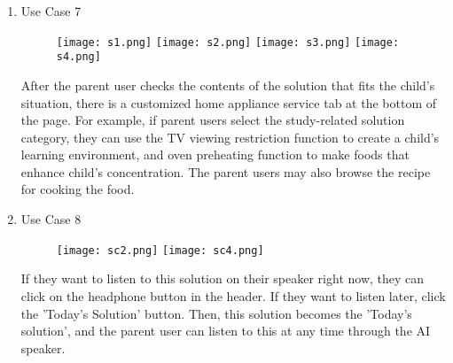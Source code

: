 \documentclass[conference]{IEEEtran}
\begin{document}
\begin{enumerate}
\begin{enumerate}
        \item Use Case 7
        \begin{figure}[H]
        \centering
        \texttt{[image: s1.png]}
        \texttt{[image: s2.png]}
        \texttt{[image: s3.png]}
        \texttt{[image: s4.png]}
        \end{figure}
        After the parent user checks the contents of the solution that fits the child's situation, there is a customized home appliance service tab at the bottom of the page. For example, if parent users select the study-related solution category, they can use the TV viewing restriction function to create a child's learning environment, and oven preheating function to make foods that enhance child’s concentration. The parent users may also browse the recipe for cooking the food.
        
        \newpage
        \item Use Case 8
        \begin{figure}[H]
        \centering
        \texttt{[image: sc2.png]}
        \texttt{[image: sc4.png]}
        \end{figure}
        If they want to listen to this solution on their speaker right now, they can click on the headphone button in the header. If they want to listen later, click the 'Today’s Solution' button. Then, this solution becomes the 'Today’s solution', and the parent user can listen to this at any time through the AI speaker.    
        
        
    \end{enumerate}
    \newpage


\end{enumerate}
\end{document}
